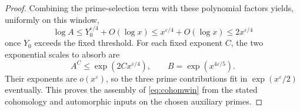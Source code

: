 \begin{proof}
Combining the prime-selection term with these polynomial factors yields, uniformly on this window,
\[
 \log A\le Y_0^{\varepsilon/4}+O(\log x)
 \le x^{\varepsilon/4}+O(\log x)\le2x^{\varepsilon/4}
\]
once \(Y_0\) exceeds the fixed threshold. For
each fixed exponent \(C\), the two exponential scales to absorb are
\[
         A^C\le \exp(2Cx^{\varepsilon/4}),\qquad
         B=\exp(x^{4\varepsilon/5}).
\]
Their exponents are \(o(x^\varepsilon)\), so the three prime
contributions fit in \(\exp(x^\varepsilon/2)\) eventually. This proves the
assembly of \eqref{eq:cohomwin} from the stated cohomology
and automorphic inputs on the chosen auxiliary primes.
\end{proof}
